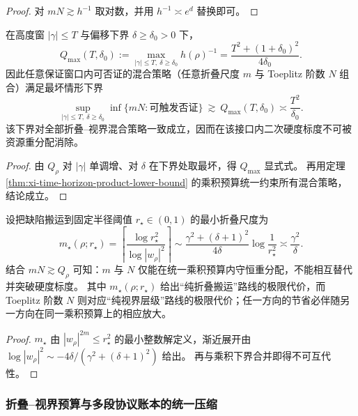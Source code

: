 \begin{proof}
对 \(mN\gtrsim h^{-1}\) 取对数，并用 \(h^{-1}\asymp e^{d}\) 替换即可。
\end{proof}

\begin{theorem}[高度窗统一硬下界与混合策略不可约二次标度]\label{thm:xi-height-window-unified-quadratic-hardness}
在高度窗 \(|\gamma|\le T\) 与偏移下界 \(\delta\ge\delta_0>0\) 下，
\[
Q_{\max}(T,\delta_0)
:=\max_{|\gamma|\le T,\ \delta\ge\delta_0}h(\rho)^{-1}
=\frac{T^2+(1+\delta_0)^2}{4\delta_0}.
\]
因此任意保证窗口内可否证的混合策略（任意折叠尺度 \(m\) 与 Toeplitz 阶数 \(N\) 组合）满足最坏情形下界
\[
\sup_{|\gamma|\le T,\ \delta\ge\delta_0}\inf\{mN:\text{可触发否证}\}
\ \gtrsim\
Q_{\max}(T,\delta_0)
\asymp
\frac{T^2}{\delta_0}.
\]
该下界对全部折叠--视界混合策略一致成立，因而在该接口内二次硬度标度不可被资源重分配消除。
\end{theorem}

\begin{proof}
由 \(Q_\rho\) 对 \(|\gamma|\) 单调增、对 \(\delta\) 在下界处取最坏，得 \(Q_{\max}\) 显式式。
再用定理 \ref{thm:xi-time-horizon-product-lower-bound} 的乘积预算统一约束所有混合策略，结论成立。
\end{proof}

\begin{proposition}\label{prop:xi-folding-scale-vs-toeplitz-order-nonsubstitutability}
设把缺陷搬运到固定半径阈值 \(r_\star\in(0,1)\) 的最小折叠尺度为
\[
m_\star(\rho;r_\star)
=
\left\lceil
\frac{\log r_\star^2}{\log|w_\rho|^2}
\right\rceil
\sim
\frac{\gamma^2+(\delta+1)^2}{4\delta}\log\frac1{r_\star^2}
\asymp
\frac{\gamma^2}{\delta}.
\]
结合 \(mN\gtrsim Q_\rho\) 可知：\(m\) 与 \(N\) 仅能在统一乘积预算内守恒重分配，不能相互替代并突破硬度标度。
其中 \(m_\star(\rho;r_\star)\) 给出“纯折叠搬运”路线的极限代价，而 Toeplitz 阶数 \(N\) 则对应“纯视界层级”路线的极限代价；任一方向的节省必伴随另一方向在同一乘积预算上的相应放大。
\end{proposition}

\begin{proof}
\(m_\star\) 由 \(|w_\rho|^{2m}\le r_\star^2\) 的最小整数解定义，渐近展开由
\(
\log|w_\rho|^2\sim -4\delta/(\gamma^2+(\delta+1)^2)
\)
给出。
再与乘积下界合并即得不可互代性。
\end{proof}

\subsubsection{折叠--视界预算与多段协议账本的统一压缩}\label{subsubsec:xi-time-protocol-budget-ledger-compression}

